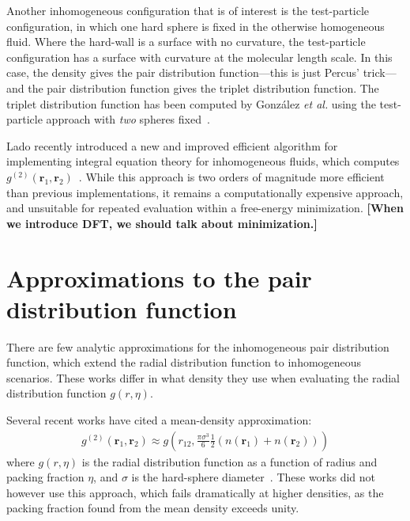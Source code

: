 \documentclass[letterpaper,twocolumn,amsmath,amssymb,pre,aps,10pt]{revtex4-1}
\newcommand{\red}[1]{{\bf \color{red} #1}}
\newcommand{\rr}{\textbf{r}}
\newcommand{\fixme}[1]{\red{[#1]}}
\begin{document}
Another inhomogeneous configuration that is of interest is the
test-particle configuration, in which one hard sphere is fixed in the
otherwise homogeneous fluid.  Where the hard-wall is a surface with no
curvature, the test-particle configuration has a surface with
curvature at the molecular length scale.  In this case, the density
gives the pair distribution function---this is just Percus'
trick---and the pair distribution function gives the triplet
distribution function.  The triplet distribution function has been computed
by Gonz\'alez \emph{et al.} using the test-particle approach with
\emph{two} spheres fixed~\cite{gonzalez1999test}.

Lado recently introduced a new and improved efficient algorithm for
implementing integral equation theory for inhomogeneous fluids, which
computes $g^{(2)}(\rr_1,\rr_2)$~\cite{lado2009efficient}.  While this
approach is two orders of magnitude more efficient than previous
implementations, it remains a computationally expensive approach, and
unsuitable for repeated evaluation within a free-energy minimization.
\fixme{When we introduce DFT, we should talk about minimization.}

\section{Approximations to the pair distribution function}
There are few analytic approximations for the inhomogeneous pair
distribution function, which extend the radial distribution function
to inhomogeneous scenarios.  These works differ in what density they
use when evaluating the radial distribution function $g(r,\eta)$.

Several recent works have cited a
mean-density approximation:
\begin{align}
  g^{(2)}(\rr_1,\rr_2) \approx g\left(r_{12}, \frac{\pi\sigma^3}{6}\tfrac12
  (n(\rr_1)+n(\rr_2))\right)
\end{align}
where $g(r,\eta)$ is the radial distribution function as a function of
radius and packing fraction $\eta$, and $\sigma$ is the hard-sphere
diameter~\cite{gloor2007prediction, gross2009density}.  These works
did not however use this approach, which fails dramatically at higher
densities, as the packing fraction found from the mean density exceeds
unity.
\end{document}
